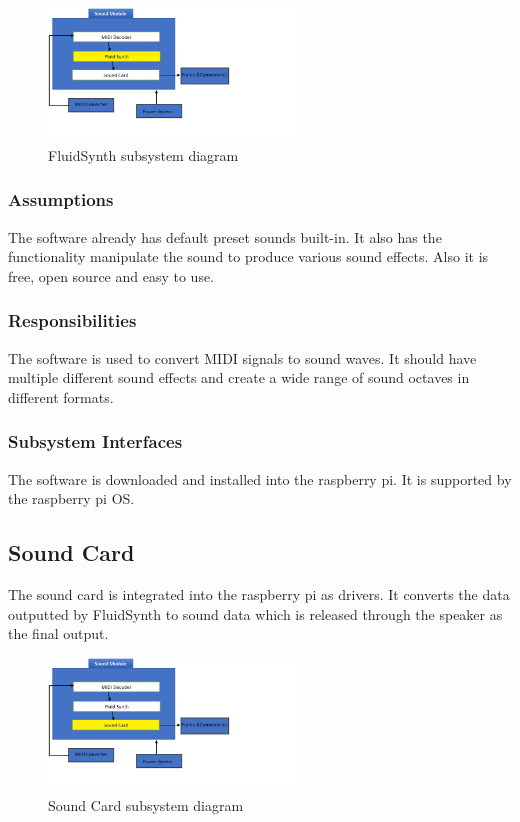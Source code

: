 \begin{figure}[h!]
	\centering
 	\includegraphics[width=0.60\textwidth]{images/fluidsynthpng}
 \caption{FluidSynth subsystem diagram}
\end{figure}

\subsubsection{Assumptions}
The software already has default preset sounds built-in. It also has the functionality manipulate the sound to produce various sound effects. Also it is free, open source and easy to use.

\subsubsection{Responsibilities}
The software is used to convert MIDI signals to sound waves. It should have multiple different sound effects and create a wide range of sound octaves in different formats.

\subsubsection{Subsystem Interfaces}
The software is downloaded and installed into the raspberry pi. It is supported by the raspberry pi OS.


\subsection{Sound Card}
The sound card is integrated into the raspberry pi as drivers. It converts the data outputted by FluidSynth to sound data which is released through the speaker as the final output.

\begin{figure}[h!]
	\centering
 	\includegraphics[width=0.60\textwidth]{images/soundcard}
 \caption{Sound Card subsystem diagram}
\end{figure}

